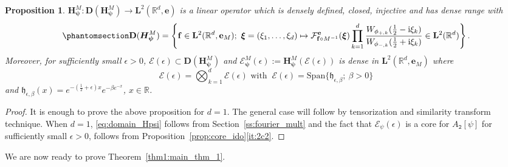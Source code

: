\documentclass[12pt]{amsart}
\newcommand{\hlabel}{\phantomsection\label}
\numberwithin{equation}{section}
\newcommand{\bb}{\mathbb}
\newcommand{\cc}{\mathcal}
\newcommand{\mf}{\mathfrak}
\newcommand{\bbm}{\mathbbm}
\newcommand{\ttt}{\mathtt}
\newcommand{\bmrm}[2][2]{\mathbf{#2}^{#1}}
\newcommand{\Span}{\mathrm{Span}}
\newcommand{\fouh}{\mathcal{F}^{\mathbf{e}}}
\newcommand{\Mpsi}{\mm^{\mathbf e}_{{\bm{\psi}}}}
\newcommand{\Hpsi}{H_\psi}
\newcommand{\D}{\mathbf{D}}
\newcommand{\eps}{\epsilon}
\newcommand{\heb}{\mf{h}_{\eps,\beta}}
\newcommand{\mm}{\mathbf{m}}
\newcommand{\f}{\mathbf{f}}
\newtheorem{prop}[thm]{Proposition}
\theoremstyle{definition}
\theoremstyle{assump}
\theoremstyle{remark}
\begin{document}
{\begin{prop}

	 $\bm{H}^M_{\bm{\psi}}:\D(\bm{H}^M_{\bm{\psi}})\to\bmrm{L}(\bb{R}^d,{\mathbf{e}})$ is a linear operator which is densely defined, closed, injective and has dense range with
	\begin{align}\hlabel{eq:domain_Hpsi}
		\D(\bm{H}^M_{{\bm{\psi}}})=\left\{\f\in\bmrm{L}(\bb{R}^d,{\mathbf{e}}_M);\ \bm{\xi}=(\xi_1,\ldots,\xi_d) \mapsto\fouh_{\f\circ M^{-1}}(\bm{\xi})\prod_{k=1}^d\frac{W_{\phi_{+,k}}(\frac{1}{2}-{\rm{i}}\xi  _k)}{W_{\phi_{-,k}}(\frac{1}{2}+{\rm{i}}\xi  _k)}\in\bmrm{L}(\bb{R}^d)\right\}.
	\end{align}
	Moreover, for sufficiently small $\eps>0$, $\bm{\cc{E}}(\eps)\subset\D(\bm{H}^M_{\bm{\psi}})$ and $\bm{\cc{E}}^M_{\bm{\psi}}(\eps):=\bm{H}^M_{\bm{\psi}}(\bm{\cc{E}}(\eps))$ is dense in $\bmrm{L}(\bb{R}^d,{\mathbf{e}}_M)$ where
	\begin{equation*}
		\bm{\cc{E}}(\eps)=\bigotimes_{k=1}^d\cc{E}(\eps) \mbox{ with } \  \cc{E}(\eps)=\Span\{\heb; \: \beta>0 \}
	\end{equation*}
and $\heb(x)=e^{-(\frac{1}{2}+\eps)x}e^{-\beta e^{-x}}$, $x\in\bb R$.
\end{prop}
\begin{proof}
It is   enough to prove the above proposition  for $d=1$. The general case will follow by tensorization and similarity transform technique. When $d=1$, \eqref{eq:domain_Hpsi} follows from Section~\ref{ss:fourier_mult} and the fact that $\cc{E}_\psi(\eps)$ is a core for $A_\ttt{2}[\psi]$ for sufficiently small $\epsilon>0$, follows from Proposition~\ref{prop:core_ido}\eqref{it:2c2}.
\end{proof}
 We are now ready to prove Theorem~\ref{thm1:main_thm_1}.

}
\end{document}
